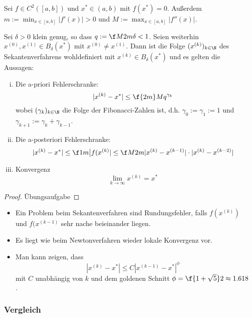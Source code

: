 \documentclass[11pt]{scrartcl}
\begin{document}
\begin{st} \label{3.6}
	Sei $f\in C^2([a,b])$ und $x^* \in (a,b)$ mit $f(x^*) = 0$.
	Außerdem $m := \min_{x \in [a,b]}|f'(x)| > 0$ und $M := \max_{x\in[a,b]}|f''(x)|$.

	Sei $\delta > 0$ klein genug, so dass $q := \f M{2m} \delta < 1$.
	Seien weiterhin $x^{(0)}, x^{(1)} \in B_\delta(x^*)$ mit $x^{(0)} \neq x^{(1)}$.
	Dann ist die Folge $(x^{(k)})_{k \in \N}$ des Sekantenverfahrens wohldefiniert mit $x^{(k)} \in B_\delta(x^*)$ und es gelten die Aussagen:
	\begin{enumerate}[i)]
		\item
			Die a-priori Fehlerschranke:
			\[
				|x^{(k)} -x^*| \le \f {2m}M q^{\gamma_k}
			\]
			wobei $(\gamma_k)_{k\in \N}$ die Folge der Fibonacci-Zahlen ist, d.h. $\gamma_0 := \gamma_1 := 1$ und $\gamma_{k+1} := \gamma_k + \gamma_{k-1}$.
		\item
			Die a-posteriori Fehlerschranke:
			\[
				|x^{(k)}-x^*| \le \f 1m \big| f(x^{(k)} | \le \f M{2m} |x^{(k)} - x^{(k-1)}| \cdot |x^{(k)}-x^{(k-2)}|
			\]
		\item
			Konvergenz
			\[
				\lim_{k \to \infty} x^{(k)} = x^*
			\]
	\end{enumerate}
	\begin{proof}
		Übungsaufgabe
	\end{proof}
	\begin{note}
		\begin{itemize}
			\item
				Ein Problem beim Sekantenverfahren sind Rundungsfehler, falls $f(x^{(k)})$ und $f(x^{(k-1)}$ sehr nache beieinander liegen.
			\item
				Es liegt wie beim Newtonverfahren wieder lokale Konvergenz vor.
			\item
				Man kann zeigen, dass
				\[
					|x^{(k)} - x^*| \le C |x^{(k-1)} - x^*|^\phi
				\]
				mit $C$ unabhängig von $k$ und dem goldenen Schnitt $\phi = \f {1+\sqrt 5}2 \approx 1.618$.
		\end{itemize}
	\end{note}
\end{st}

\subsubsection{Vergleich}
\end{document}

